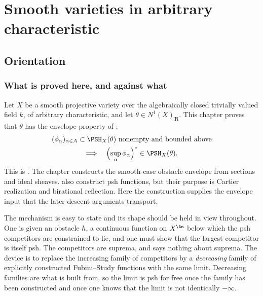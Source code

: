 \chapter{Smooth varieties in arbitrary characteristic}
\label{chap:bj-smooth-characteristic}

\section{Orientation}
\label{sec:ch40-orientation}

\subsection{What is proved here, and against what}
\label{sec:ch40-what}

Let $X$ be a smooth projective variety over the algebraically closed
trivially valued field $k$, of arbitrary characteristic, and let
$\theta\in N^1(X)_{\mathbf R}$.  This chapter proves that
$\theta$ has the envelope property of
:
\[
 \begin{gathered}
 (\phi_\alpha)_{\alpha\in A}\subset\PSH_X(\theta)
 \ \text{nonempty and bounded above}\\
 \Longrightarrow\quad
 \Bigl(\sup_\alpha\phi_\alpha\Bigr)^*\in\PSH_X(\theta).
 \end{gathered}
\]
This is .  The chapter constructs the
smooth-case obstacle envelope from sections and ideal sheaves.
 also construct psh
functions, but their purpose is Cartier realization and birational
reflection.  Here the construction supplies the envelope input that the
later descent arguments transport.

The mechanism is easy to state and its shape should be held in view
throughout.  One is given an obstacle $h$, a continuous function on
$X^{\An}$ below which the psh competitors are constrained to lie, and one
must show that the largest competitor is itself psh.  The competitors are
suprema, and  says nothing about suprema.  The
device is to replace the increasing family of competitors by a
\emph{decreasing} family of explicitly constructed Fubini--Study functions
with the same limit.  Decreasing families are what
 is built from, so the limit is psh for free once the
family has been constructed and once one knows that the limit is not
identically $-\infty$.

